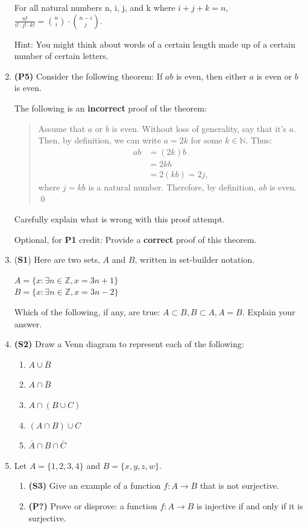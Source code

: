 \documentclass[12pt]{article}
\begin{document}
\begin{enumerate}
For all natural numbers n, i, j, and k where $i+j+k=n$, $\frac{n!}{i! \cdot j! \cdot k!} = \binom{n}{i} \cdot \binom{n-i}{j}$.

Hint: You might think about words of a certain length made up of a certain number of certain letters.

\item \textbf{(P5)} Consider the following theorem: If $ab$ is even, then either $a$ is even or $b$ is even.

The following is an \textbf{incorrect} proof of the theorem:
\begin{quotation}
Assume that $a$ or $b$ is even. Without loss of generality, say that it's $a$. Then, by definition, we can write $a = 2k$ for some $k\in\mathbb{N}$. Thus:
\begin{align*}
    ab &= (2k) b \\
    &= 2kb \\
    &= 2(kb) = 2j,
\end{align*}
where $j = kb$ is a natural number. Therefore, by definition, $ab$ is even. \qed
\end{quotation}
Carefully explain what is wrong with this proof attempt.

Optional, for \textbf{P1} credit: Provide a \textbf{correct} proof of this theorem.

\item (\textbf{S1})
Here are two sets, $A$ and $B$, written in set-builder notation.  
\begin{center}
$A=\{x: \exists n \in \mathbb{Z}, x=3n+1\}$ \\
$B=\{x: \exists n \in \mathbb{Z}, x=3n-2\}$
\end{center}

Which of the following, if any, are true: $A \subset B, B \subset A, A=B$. Explain your answer.

\item \textbf{(S2)} Draw a Venn diagram to represent each of the following:
\begin{enumerate}
    \item $A\cup \overline{B}$
    \item $A\cap\overline{B}$
    \item $A\cap(B\cup C)$
    \item $(A \cap B) \cup C$
    \item $\overline{A} \cap B \cap \overline{C}$
\end{enumerate}

\item Let $A = \{1,2,3,4\}$ and $B = \{x,y,z,w\}$. 
\begin{enumerate}
    \item \textbf{(S3)} Give an example of a function $f:A\to B$ that is not surjective. 
    \item \textbf{(P?)} Prove or disprove: a function $f:A\to B$ is injective if and only if it is surjective.
\end{enumerate}


\end{enumerate}
\end{document}
